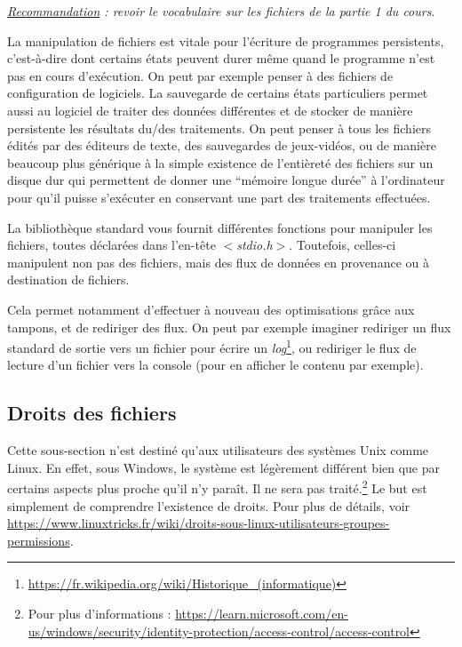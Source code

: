 \documentclass[../../../main.tex]{subfiles}
\begin{document}
\textit{\underline{Recommandation} : revoir le vocabulaire sur les fichiers de la partie 1 du cours}.
 
La manipulation de fichiers est vitale pour l'écriture de programmes persistents, c'est-à-dire dont certains états peuvent durer même quand le programme n'est pas en cours d'exécution. On peut par exemple penser à des fichiers de configuration de logiciels. La sauvegarde de certains états particuliers permet aussi au logiciel de traiter des données différentes et de stocker de manière persistente les résultats du/des traitements. On peut penser à tous les fichiers édités par des éditeurs de texte, des sauvegardes de jeux-vidéos, ou de manière beaucoup plus générique à la simple existence de l'entièreté des fichiers sur un disque dur qui permettent de donner une ``mémoire longue durée'' à l'ordinateur pour qu'il puisse s'exécuter en conservant une part des traitements effectuées.
 
La bibliothèque standard vous fournit différentes fonctions pour manipuler les fichiers, toutes déclarées dans l’en-tête \textit{$<$stdio.h$>$}. Toutefois, celles-ci manipulent non pas des fichiers, mais des flux de données en provenance ou à destination de fichiers.
 
Cela permet notamment d'effectuer à nouveau des optimisations grâce aux tampons, et de rediriger des flux. On peut par exemple imaginer rediriger un flux standard de sortie vers un fichier pour écrire un \textit{log}\footnote{\url{https://fr.wikipedia.org/wiki/Historique_(informatique)}}, ou rediriger le flux de lecture d'un fichier vers la console (pour en afficher le contenu par exemple).
\subsection{Droits des fichiers}
Cette sous-section n'est destiné qu'aux utilisateurs des systèmes Unix comme Linux. En effet, sous Windows, le système est légèrement différent bien que par certains aspects plus proche qu'il n'y paraît. Il ne sera pas traité.\footnote{Pour plus d'informations : \url{https://learn.microsoft.com/en-us/windows/security/identity-protection/access-control/access-control}} Le but est simplement de comprendre l'existence de droits. Pour plus de détails, voir \url{https://www.linuxtricks.fr/wiki/droits-sous-linux-utilisateurs-groupes-permissions}.
 
\end{document}
